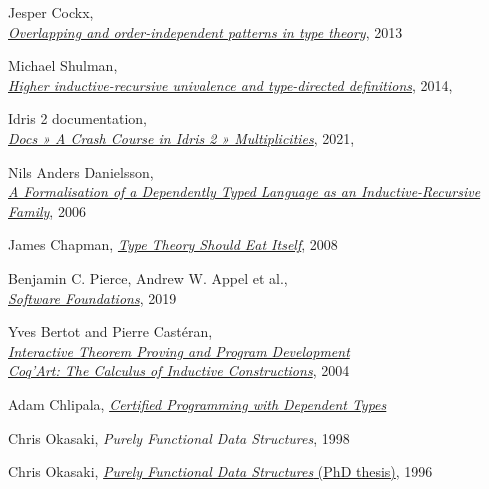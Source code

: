 \documentclass[declaration,mgr,english,shortabstract]{iithesis}
\begin{document}
\begin{thebibliography}{1}
    Jesper Cockx, \\
    \href{https://www.scriptiebank.be/sites/default/files/webform/scriptie/masterpaper_5.pdf}{\textit{Overlapping and order-independent patterns in type theory}}, 2013

    Michael Shulman, \\
    \href{https://homotopytypetheory.org/2014/06/08/hiru-tdd/}{\textit{Higher inductive-recursive univalence and type-directed definitions}}, 2014, \\

    Idris 2 documentation, \\
    \href{https://idris2.readthedocs.io/en/latest/tutorial/multiplicities.html}{\textit{Docs » A Crash Course in Idris 2 » Multiplicities}}, 2021, \\

    Nils Anders Danielsson, \\
    \href{http://www.cse.chalmers.se/~nad/publications/danielsson-types2006.pdf}{\textit{A Formalisation of a Dependently Typed Language as an Inductive-Recursive Family}}, 2006

    James Chapman,
    \href{https://www.sciencedirect.com/science/article/pii/S157106610800577X}{\textit{Type Theory Should Eat Itself}},
    2008

    Benjamin C. Pierce, Andrew W. Appel et al., \\
    \href{https://softwarefoundations.cis.upenn.edu/}{\textit{Software Foundations}}, 2019

    Yves Bertot and Pierre Castéran, \\
    \href{https://www.labri.fr/perso/casteran/CoqArt/}{\textit{Interactive Theorem Proving and Program Development \\ Coq'Art: The Calculus of Inductive Constructions}}, 2004

    Adam Chlipala,
    \href{http://adam.chlipala.net/cpdt/}{\textit{Certified Programming with Dependent Types}}

    Chris Okasaki,
    \textit{Purely Functional Data Structures},
    1998

    Chris Okasaki,
    \href{https://www.cs.cmu.edu/~rwh/theses/okasaki.pdf}{\textit{Purely Functional Data Structures} (PhD thesis)},
    1996


\end{thebibliography}
\end{document}
